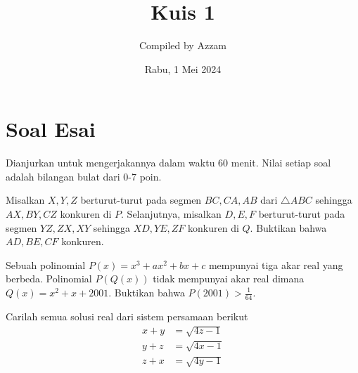 \documentclass[11pt]{scrartcl}
\begin{document}
	\title{Kuis 1} %
	\date{Rabu, 1 Mei 2024}
	\author{Compiled by Azzam}
	\maketitle
	
\section{Soal Esai}
Dianjurkan untuk mengerjakannya dalam waktu 60 menit. Nilai setiap soal adalah bilangan bulat dari 0-7 poin.   
    \begin{soalbaru}
        Misalkan $X,Y,Z$ berturut-turut pada segmen $BC,CA,AB$ dari $\triangle ABC$ sehingga $AX, BY, CZ$ konkuren di $P$. Selanjutnya, misalkan $D,E,F$ berturut-turut pada segmen $YZ,ZX,XY$ sehingga $XD,YE,ZF$ konkuren di $Q$. Buktikan bahwa $AD,BE,CF$ konkuren.
    \end{soalbaru}


    \begin{soalbaru}
		Sebuah polinomial $P(x)=x^3+ax^2+bx+c$ mempunyai tiga akar real yang berbeda. Polinomial $P(Q(x))$ tidak mempunyai akar real dimana $Q(x)=x^2+x+2001$. Buktikan bahwa $P(2001)>\frac{1}{64}$.
    \end{soalbaru}	

    \begin{soalbaru}
        Carilah semua solusi real dari sistem persamaan berikut
	\begin{align*}
		x+y &= \sqrt{4z-1} \\
		y+z &= \sqrt{4x-1} \\
		z+x &= \sqrt{4y-1}
	\end{align*}
    \end{soalbaru}
\end{document}
